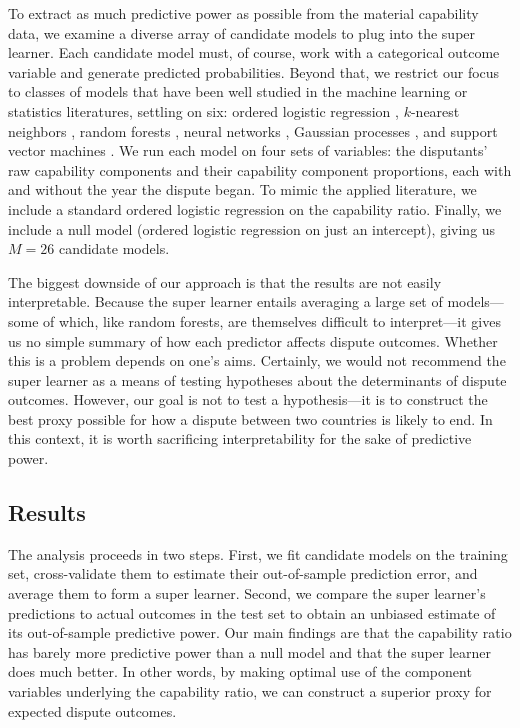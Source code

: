 To extract as much predictive power as possible from the material capability data, we examine a diverse array of candidate models to plug into the super learner.
Each candidate model must, of course, work with a categorical outcome variable and generate predicted probabilities.
Beyond that, we restrict our focus to classes of models that have been well studied in the machine learning or statistics literatures, settling on six: ordered logistic regression \citep{McKelvey:2010gv}, $k$-nearest neighbors \citep{Cover:1967jq}, random forests \citep{Breiman:2001fb}, neural networks \citep{Ripley:1996vd}, Gaussian processes \citep{Rasmussen:2006vz}, and support vector machines \citep{Cortes:1995ie}.
We run each model on four sets of variables: the disputants' raw capability components and their capability component proportions, each with and without the year the dispute began.
To mimic the applied literature, we include a standard ordered logistic regression on the capability ratio.
Finally, we include a null model (ordered logistic regression on just an intercept), giving us $M = 26$ candidate models.

The biggest downside of our approach is that the results are not easily interpretable.
Because the super learner entails averaging a large set of models---some of which, like random forests, are themselves difficult to interpret---it gives us no simple summary of how each predictor affects dispute outcomes.
Whether this is a problem depends on one's aims.
Certainly, we would not recommend the super learner as a means of testing hypotheses about the determinants of dispute outcomes.
However, our goal is not to test a hypothesis---it is to construct the best proxy possible for how a dispute between two countries is likely to end.
In this context, it is worth sacrificing interpretability for the sake of predictive power.

\subsection{Results}

The analysis proceeds in two steps.
First, we fit candidate models on the training set, cross-validate them to estimate their out-of-sample prediction error, and average them to form a super learner.
Second, we compare the super learner's predictions to actual outcomes in the test set to obtain an unbiased estimate of its out-of-sample predictive power.
Our main findings are that the capability ratio has barely more predictive power than a null model and that the super learner does much better.
In other words, by making optimal use of the component variables underlying the capability ratio, we can construct a superior proxy for expected dispute outcomes.

